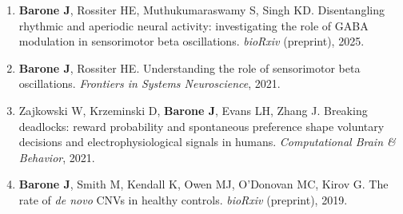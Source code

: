 
\begin{cvparagraph}
\begin{enumerate}[leftmargin=1.5em, topsep=0pt, itemsep=2mm, parsep=0pt]
  \item \textbf{Barone J}, Rossiter HE, Muthukumaraswamy S, Singh KD. Disentangling rhythmic and aperiodic neural activity: investigating the role of GABA modulation in sensorimotor beta oscillations. \textit{bioRxiv} (preprint), 2025.
  \item \textbf{Barone J}, Rossiter HE. Understanding the role of sensorimotor beta oscillations. \textit{Frontiers in Systems Neuroscience}, 2021.
  \item Zajkowski W, Krzeminski D, \textbf{Barone J}, Evans LH, Zhang J. Breaking deadlocks: reward probability and spontaneous preference shape voluntary decisions and electrophysiological signals in humans. \textit{Computational Brain \& Behavior}, 2021.
  \item \textbf{Barone J}, Smith M, Kendall K, Owen MJ, O'Donovan MC, Kirov G. The rate of \textit{de novo} CNVs in healthy controls. \textit{bioRxiv} (preprint), 2019.
\end{enumerate}
\end{cvparagraph}
